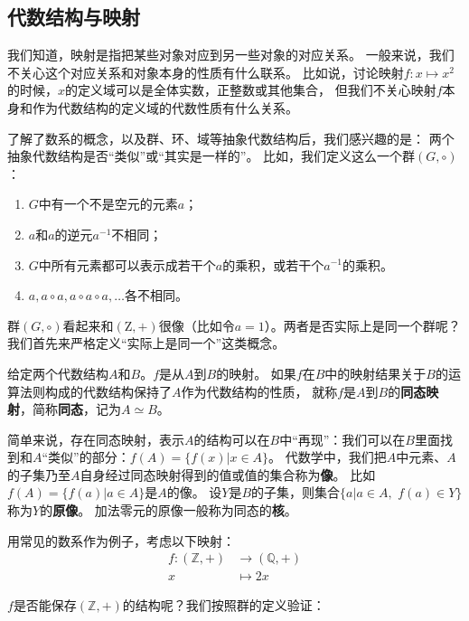 \documentclass[12pt,UTF8]{ctexbook}
\begin{document}
\begin{appendix}
\section{代数结构与映射}
我们知道，映射是指把某些对象对应到另一些对象的对应关系。
一般来说，我们不关心这个对应关系和对象本身的性质有什么联系。
比如说，讨论映射$f: x \mapsto x^2$的时候，$x$的定义域可以是全体实数，正整数或其他集合，
但我们不关心映射$f$本身和作为代数结构的定义域的代数性质有什么关系。

了解了数系的概念，以及群、环、域等抽象代数结构后，我们感兴趣的是：
两个抽象代数结构是否“类似”或“其实是一样的”。
比如，我们定义这么一个群$(G,\circ)$：
\begin{enumerate}
    \item $G$中有一个不是空元的元素$a$；
    \item $a$和$a$的逆元$a^{-1}$不相同；
    \item $G$中所有元素都可以表示成若干个$a$的乘积，或若干个$a^{-1}$的乘积。
    \item $a, a\circ a, a\circ a \circ a, \ldots $各不相同。
\end{enumerate}

群$(G,\circ)$看起来和$\left(\mathrm{Z}, +\right)$很像（比如令$a = 1$）。两者是否实际上是同一个群呢？
我们首先来严格定义“实际上是同一个”这类概念。

\begin{df}\label{df:0_4}
    给定两个代数结构$A$和$B$。$f$是从$A$到$B$的映射。
    如果$f$在$B$中的映射结果关于$B$的运算法则构成的代数结构保持了$A$作为代数结构的性质，
    就称$f$是$A$到$B$的\textbf{同态映射}，简称\textbf{同态}，记为$A \simeq B$。
\end{df}

简单来说，存在同态映射，表示$A$的结构可以在$B$中“再现”：我们可以在$B$里面找到和$A$“类似”的部分：$f(A) = \{f(x) | x \in A\}$。
代数学中，我们把$A$中元素、$A$的子集乃至$A$自身经过同态映射得到的值或值的集合称为\textbf{像}。
比如$f(A) = \{f(a) | a \in A\}$是$A$的像。
设$Y$是$B$的子集，则集合$\{a |a \in A, \,\, f(a) \in Y\}$称为$Y$的\textbf{原像}。
加法零元的原像一般称为同态的\textbf{核}。

用常见的数系作为例子，考虑以下映射：
\begin{align*}
    f : \left(\mathbb{Z},+\right) &\rightarrow \left(\mathbb{Q},+\right)  \\
        x          &\mapsto 2 x 
\end{align*}

$f$是否能保存$\left(\mathbb{Z},+\right)$的结构呢？我们按照群的定义验证：


\end{appendix}
\end{document}
